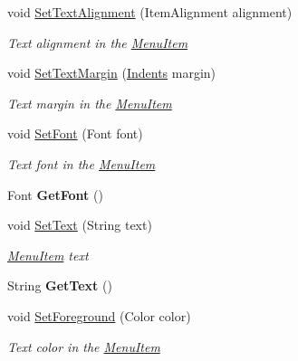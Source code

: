 \begin{DoxyCompactItemize}
\begin{DoxyCompactList}
\end{DoxyCompactList}\item 
void \mbox{\hyperlink{class_space_v_i_l_1_1_menu_item_a04dea3a18d50459b3a5bd25c4421f56b}{Set\+Text\+Alignment}} (Item\+Alignment alignment)
\begin{DoxyCompactList}\small\item\em Text alignment in the \mbox{\hyperlink{class_space_v_i_l_1_1_menu_item}{Menu\+Item}} \end{DoxyCompactList}\item 
void \mbox{\hyperlink{class_space_v_i_l_1_1_menu_item_a91be48e8848efeafce18980725031e09}{Set\+Text\+Margin}} (\mbox{\hyperlink{struct_space_v_i_l_1_1_decorations_1_1_indents}{Indents}} margin)
\begin{DoxyCompactList}\small\item\em Text margin in the \mbox{\hyperlink{class_space_v_i_l_1_1_menu_item}{Menu\+Item}} \end{DoxyCompactList}\item 
void \mbox{\hyperlink{class_space_v_i_l_1_1_menu_item_a8f81cd6c91a758c5040c0fff74d803eb}{Set\+Font}} (Font font)
\begin{DoxyCompactList}\small\item\em Text font in the \mbox{\hyperlink{class_space_v_i_l_1_1_menu_item}{Menu\+Item}} \end{DoxyCompactList}\item 
\mbox{\label{class_space_v_i_l_1_1_menu_item_a6d6f463d4323233c57692136bd37fc21}} 
Font {\bfseries Get\+Font} ()
\item 
void \mbox{\hyperlink{class_space_v_i_l_1_1_menu_item_aaf17e0e26cc6532de675cc6d2fdafc1e}{Set\+Text}} (String text)
\begin{DoxyCompactList}\small\item\em \mbox{\hyperlink{class_space_v_i_l_1_1_menu_item}{Menu\+Item}} text \end{DoxyCompactList}\item 
\mbox{\label{class_space_v_i_l_1_1_menu_item_a2c1e69141686df11fa69942e9fafcbc0}} 
String {\bfseries Get\+Text} ()
\item 
void \mbox{\hyperlink{class_space_v_i_l_1_1_menu_item_ab66887ca29fcd817a4b4505e92e01919}{Set\+Foreground}} (Color color)
\begin{DoxyCompactList}\small\item\em Text color in the \mbox{\hyperlink{class_space_v_i_l_1_1_menu_item}{Menu\+Item}} \end{DoxyCompactList}\item 

\end{DoxyCompactItemize}

